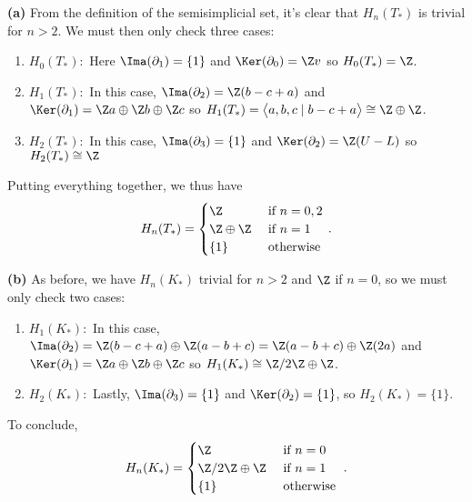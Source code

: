 \documentclass[11pt,letterpaper]{article}
\begin{document}
\begin{solution}
    \textbf{(a)} From the definition of the semisimplicial set, it's clear that $H_n(T_*)$ is trivial for $n>2$. We must then only check three cases:

    \begin{enumerate}
        \item $H_0(T_*):$ Here $\Ima(\partial_1)=\{1\}$ and $\Ker(\partial_0)=\Z v$ so $H_0(T_*)=\Z$.   
        \item $H_1(T_*):$ In this case, $\Ima(\partial_2)=\Z(b-c+a)$ and $\Ker(\partial_1)=\Z a \oplus \Z b\oplus \Z c$ so $H_1(T_*)=\big\langle a, b, c \mid b-c+a \big\rangle\cong \Z\oplus \Z$.
        \item $H_2(T_*):$ In this case, $\Ima(\partial_3)=\{1\}$ and $\Ker(\partial_2)=\Z(U-L)$ so $H_2(T_*)\cong\Z$   
    \end{enumerate}
    Putting everything together, we thus have
    \[
        H_n(T_*)=\begin{cases}
            \Z &\textrm{ if }n=0,2\\
            \Z\oplus \Z&\textrm{ if }n=1\\
            \{1\}&\textrm{ otherwise }
        \end{cases}
    .\] 

    \textbf{(b)} As before, we have $H_n(K_*)$ trivial for $n > 2$ and $\Z$ if $n = 0$, so we must only check two cases:
    
    \begin{enumerate}
        \item $H_1(K_*):$ In this case, $\Ima(\partial_2)=\Z(b-c+a)\oplus \Z(a-b+c)=\Z(a-b+c)\oplus \Z(2a)$ and $\Ker(\partial_1)=\Z a\oplus \Z b\oplus \Z c$ so $H_1(K_*)\cong \Z /2\Z \oplus \Z$.
        \item $H_2(K_*):$ Lastly, $\Ima(\partial_3)=\{1\}$ and $\Ker(\partial_2)=\{1\}$, so $H_2(K_*)=\{1\}$.    
    \end{enumerate}
    
    To conclude,
    \[
        H_n(K_*)=\begin{cases}
            \Z&\textrm{ if }n=0\\
            \Z / 2\Z\oplus \Z &\textrm{ if }n=1\\
            \{1\}&\textrm{ otherwise }
        \end{cases}
    .\]


\end{solution}
\end{document}

